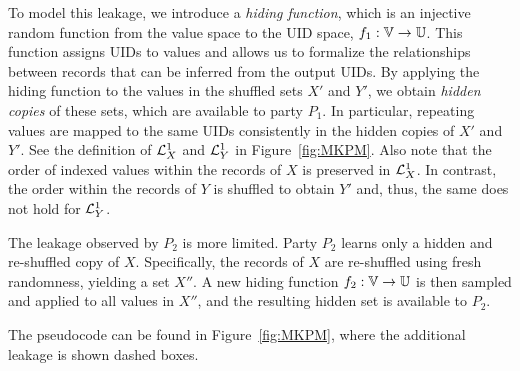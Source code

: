 To model this leakage, we introduce a \emph{hiding function}, which is an
injective random function from the value space to the UID space,
$f_1:\Ispace\to\Uspace$. This function assigns UIDs to values and allows us to
formalize the relationships between records that can be inferred from the output
UIDs. By applying the hiding function to the values in the shuffled sets $X'$ and $Y'$, we
obtain \emph{hidden copies} of these sets, which are available to party $P_1$.
In particular, repeating values are mapped to the same UIDs consistently in the hidden copies of $X'$ and $Y'$.
See the definition of $\mathcal{L}^{1}_X$ and $\mathcal{L}^{1}_Y$ in Figure~\ref{fig:MKPM}.
Also note that the order of indexed values within the records of $X$
is preserved in $\mathcal{L}^{1}_X$. In contrast, the order within the records of $Y$ is shuffled
to obtain $Y'$ and, thus, the same does not hold for $\mathcal{L}^{1}_Y$.

The leakage observed by $P_2$ is more limited. Party $P_2$ learns only a hidden
and re-shuffled copy of $X$. Specifically, the records of $X$ are re-shuffled
using fresh randomness, yielding a set $X''$. A new hiding function
$f_2 : \Ispace \to \Uspace$ is then sampled and applied to all values in $X''$,
and the resulting hidden set is available to $P_2$.

The pseudocode can be found in Figure~\ref{fig:MKPM}, where the additional
leakage is shown dashed boxes.
